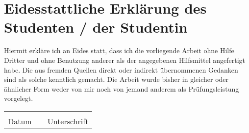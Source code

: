 \documentclass[12pt]{article}
\begin{document}
\pagestyle{fancy} %
\fancyhf{} %

\vspace*{1.5em}

\section*{Eidesstattliche Erklärung des Studenten / der Studentin}

Hiermit erkläre ich an Eides statt, dass ich die vorliegende Arbeit ohne Hilfe Dritter und ohne Benutzung anderer als der angegebenen Hilfsmittel angefertigt habe. Die aus fremden Quellen direkt oder indirekt übernommenen Gedanken sind als solche kenntlich gemacht. Die Arbeit wurde bisher in gleicher oder ähnlicher Form weder von mir noch von jemand anderem als Prüfungsleistung vorgelegt.

\vspace{3em}

\renewcommand{\arraystretch}{1.5} %

\begin{tabular}{%
        m{}
        m{}
        m{}
    }
          &  &              \\ \cline{1-1} \cline{3-3}
    Datum &  & Unterschrift \\
\end{tabular}
\end{document}
